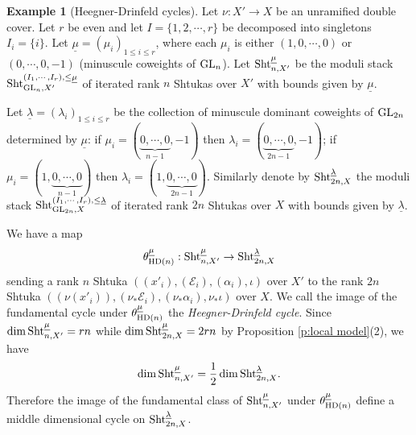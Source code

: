 \documentclass[11pt]{amsart}
\numberwithin{equation}{section}
\theoremstyle{plain}
\theoremstyle{definition}
\newtheorem{exam}[subsubsection]{Example}
\newcommand\cE{\mathcal{E}}
\newcommand\Sht{\textup{Sht}}
\newcommand\GL{\textup{GL}}
\newcommand\un{\underline}
\renewcommand\a\alpha
\newcommand{\io}{\iota}
\renewcommand{\th}{\theta}
\renewcommand{\l}{\lambda}
\newcommand\HD{\textup{HD}}
\begin{document}
\begin{exam}[Heegner-Drinfeld cycles]\label{ex:HD} Let $\nu: X'\to X$ be an unramified double cover. Let $r$ be even and let $I=\{1,2,\cdots, r\}$ be decomposed into singletons $I_{i}=\{i\}$. Let $\un\mu=(\mu_{i})_{1\le i\le r}$, where each $\mu_{i}$ is either $(1,0,\cdots,0)$ or $(0,\cdots, 0,-1)$ (minuscule coweights of $\GL_{n}$). Let $\Sht^{\un\mu}_{n,X'}$ be the moduli stack $\Sht^{(I_{1},\cdots, I_{r}),\le\un\mu}_{\GL_{n},X'}$ of iterated rank $n$ Shtukas over $X'$ with bounds given by $\un\mu$. 

Let $\un\l=(\l_{i})_{1\le i\le r}$ be the collection of minuscule dominant coweights of $\GL_{2n}$ determined by $\un\mu$: if $\mu_{i}=(\underbrace{0,\cdots, 0}_{n-1},-1)$ then $\l_{i}=(\underbrace{0,\cdots,0}_{2n-1}, -1)$; if $\mu_{i}=(1,\underbrace{0,\cdots,0}_{n-1})$ then $\l_{i}=(1, \underbrace{0,\cdots,0}_{2n-1})$. Similarly denote by $\Sht^{\un\l}_{2n,X}$ the moduli stack $\Sht^{(I_{1},\cdots, I_{r}),\le\un\l}_{\GL_{2n},X}$ of iterated rank $2n$ Shtukas over $X$ with bounds given by $\un\l$. 

We have a map
\begin{equation*}
\th^{\un\mu}_{\HD(n)}: \Sht^{\un\mu}_{n, X'}\to \Sht^{\un\l}_{2n,X}
\end{equation*}
sending a rank $n$ Shtuka $((x'_{i}), (\cE_{i}), (\a_{i}), \io)$ over $X'$ to the rank $2n$ Shtuka $((\nu(x'_{i})), (\nu_{*}\cE_{i}),(\nu_{*}\a_{i}), \nu_{*}\io)$ over $X$. We call the image of the fundamental cycle under $\th^{\un\mu}_{\HD(n)}$ the {\em Heegner-Drinfeld cycle}. Since $\dim \Sht^{\un\mu}_{n,X'}=rn$ while $\dim \Sht^{\un\mu}_{2n,X}=2rn$ by Proposition \ref{p:local model}(2), we have
\begin{equation*}
\dim  \Sht^{\un\mu}_{n,X'}=\frac{1}{2}\dim \Sht^{\un\l}_{2n,X}.
\end{equation*}
Therefore the image of the fundamental class of $\Sht^{\un\mu}_{n,X'}$ under $\th^{\un\mu}_{\HD(n)}$ define a middle dimensional cycle on $\Sht^{\un\l}_{2n,X}$. 
 


\end{exam}
\end{document}

